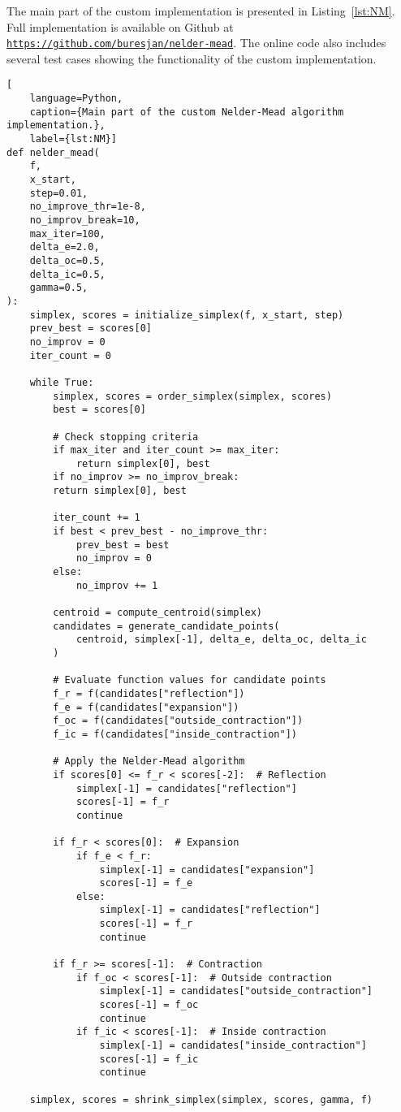 The main part of the custom implementation is presented in Listing~\ref{lst:NM}. Full implementation is available on Github at \href{https://github.com/buresjan/nelder-mead}{\texttt{https://github.com/buresjan/nelder-mead}}. The online code also includes several test cases showing the functionality of the custom implementation.

\newpage
\begin{lstlisting}[
	language=Python,
	caption={Main part of the custom Nelder-Mead algorithm implementation.},
	label={lst:NM}]
def nelder_mead(
	f,
	x_start,
	step=0.01,
	no_improve_thr=1e-8,
	no_improv_break=10,
	max_iter=100,
	delta_e=2.0,
	delta_oc=0.5,
	delta_ic=0.5,
	gamma=0.5,
):
	simplex, scores = initialize_simplex(f, x_start, step)
	prev_best = scores[0]
	no_improv = 0
	iter_count = 0
	
	while True:
		simplex, scores = order_simplex(simplex, scores)
		best = scores[0]
		
		# Check stopping criteria
		if max_iter and iter_count >= max_iter:
			return simplex[0], best
		if no_improv >= no_improv_break:
		return simplex[0], best
		
		iter_count += 1
		if best < prev_best - no_improve_thr:
			prev_best = best
			no_improv = 0
		else:
			no_improv += 1
		
		centroid = compute_centroid(simplex)
		candidates = generate_candidate_points(
			centroid, simplex[-1], delta_e, delta_oc, delta_ic
		)
		
		# Evaluate function values for candidate points
		f_r = f(candidates["reflection"])
		f_e = f(candidates["expansion"])
		f_oc = f(candidates["outside_contraction"])
		f_ic = f(candidates["inside_contraction"])
		
		# Apply the Nelder-Mead algorithm
		if scores[0] <= f_r < scores[-2]:  # Reflection
			simplex[-1] = candidates["reflection"]
			scores[-1] = f_r
			continue
		
		if f_r < scores[0]:  # Expansion
			if f_e < f_r:
				simplex[-1] = candidates["expansion"]
				scores[-1] = f_e
			else:
				simplex[-1] = candidates["reflection"]
				scores[-1] = f_r
				continue
		
		if f_r >= scores[-1]:  # Contraction
			if f_oc < scores[-1]:  # Outside contraction
				simplex[-1] = candidates["outside_contraction"]
				scores[-1] = f_oc
				continue
			if f_ic < scores[-1]:  # Inside contraction
				simplex[-1] = candidates["inside_contraction"]
				scores[-1] = f_ic
				continue
		
	simplex, scores = shrink_simplex(simplex, scores, gamma, f)
\end{lstlisting}